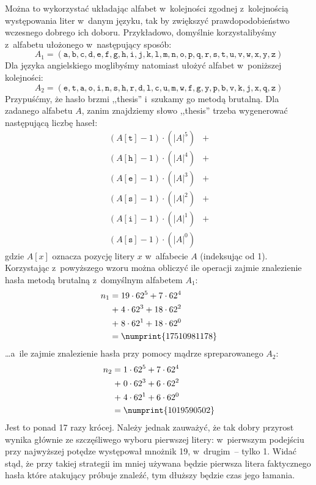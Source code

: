 Można to wykorzystać układając alfabet w~kolejności zgodnej z~kolejnością
występowania liter w~danym języku, tak by zwiększyć prawdopodobieństwo
wczesnego dobrego ich doboru. Przykładowo, domyślnie korzystalibyśmy
z~alfabetu ułożonego w~następujący sposób:
    $$A_1 = (
    \mathtt{a}, \mathtt{b}, \mathtt{c}, \mathtt{d}, \mathtt{e}, \mathtt{f},
    \mathtt{g}, \mathtt{h}, \mathtt{i}, \mathtt{j}, \mathtt{k}, \mathtt{l},
    \mathtt{m}, \mathtt{n}, \mathtt{o}, \mathtt{p}, \mathtt{q}, \mathtt{r},
    \mathtt{s}, \mathtt{t}, \mathtt{u}, \mathtt{v}, \mathtt{w}, \mathtt{x},
    \mathtt{y}, \mathtt{z})$$
Dla języka angielskiego moglibyśmy natomiast ułożyć alfabet w~poniższej
kolejności:
    $$A_2 = (
    \mathtt{e}, \mathtt{t}, \mathtt{a}, \mathtt{o}, \mathtt{i}, \mathtt{n},
    \mathtt{s}, \mathtt{h}, \mathtt{r}, \mathtt{d}, \mathtt{l}, \mathtt{c},
    \mathtt{u}, \mathtt{m}, \mathtt{w}, \mathtt{f}, \mathtt{g}, \mathtt{y},
    \mathtt{p}, \mathtt{b}, \mathtt{v}, \mathtt{k}, \mathtt{j}, \mathtt{x},
    \mathtt{q}, \mathtt{z})$$
\newpage
Przypuśćmy, że hasło brzmi ,,thesis'' i~szukamy go metodą brutalną.
Dla zadanego alfabetu $A$, zanim znajdziemy słowo ,,thesis'' trzeba wygenerować
następującą liczbę haseł:
    \[
        \begin{aligned}
        (A[\mathtt{t}]-1)\cdot(|A|^5) &+\\
        (A[\mathtt{h}]-1)\cdot(|A|^4) &+\\
        (A[\mathtt{e}]-1)\cdot(|A|^3) &+\\
        (A[\mathtt{s}]-1)\cdot(|A|^2) &+\\
        (A[\mathtt{i}]-1)\cdot(|A|^1) &+\\
        (A[\mathtt{s}]-1)\cdot(|A|^0)
        \end{aligned}
    \]
gdzie $A[x]$ oznacza pozycję litery $x$ w~alfabecie $A$ (indeksując od 1).
Korzystając z~powyższego wzoru można obliczyć ile operacji zajmie znalezienie
hasła metodą brutalną z~domyślnym alfabetem $A_1$:
    \[
        \begin{aligned}
        n_1=\;&19 \cdot 62^5 + 7 \cdot 62^4 \\
        +\;&4 \cdot 62^3 + 18 \cdot 62^2 \\
        +\;&8 \cdot 62^1 + 18 \cdot 62^0 \\
        =\;&\numprint{17510981178}
        \end{aligned}
    \]
\ldots a~ile zajmie znalezienie hasła przy pomocy mądrze spreparowanego
$A_2$:
    \[
        \begin{aligned}
        n_2=\;&1 \cdot 62^5 + 7 \cdot 62^4 \\
        +\;&0 \cdot 62^3 + 6 \cdot 62^2 \\
        +\;&4 \cdot 62^1 + 6 \cdot 62^0 \\
        =\;&\numprint{1019590502}
        \end{aligned}
    \]
Jest to ponad 17 razy krócej. Należy jednak zauważyć, że tak dobry przyrost
wynika głównie ze szczęśliwego wyboru pierwszej litery: w~pierwszym podejściu
przy najwyższej potędze występował mnożnik 19, w~drugim~-- tylko 1. Widać stąd,
że przy takiej strategii im mniej używana będzie pierwsza litera faktycznego
hasła które atakujący próbuje znaleźć, tym dłuższy będzie czas jego łamania.

